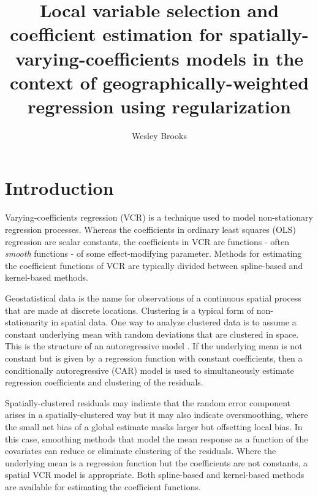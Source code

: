 \documentclass[authoryear, review, 11pt]{elsarticle}
\title{Local variable selection and coefficient estimation for spatially-varying-coefficients models in the context of geographically-weighted regression using regularization}
\author{Wesley Brooks}
\date{}                                           %
\begin{document}
\maketitle





\section{Introduction}
	Varying-coefficients regression (VCR) \citep{Hastie:1993a} is a technique used to model non-stationary regression processes. Whereas the coefficients in ordinary least squares (OLS) regression are scalar constants, the coefficients in VCR are functions - often \emph{smooth} functions - of some effect-modifying parameter.  Methods for estimating the coefficient functions of VCR are typically divided between spline-based \citep{Wood:2006} and kernel-based \citep{Hastie:1993b, Loader:1999} methods. 
	
	Geostatistical data is the name for observations of a continuous spatial process that are made at discrete locations. 
	Clustering is a typical form of non-stationarity in spatial data. One way to analyze clustered data is to assume a constant underlying mean with random deviations that are clustered in space. This is the structure of an autoregressive model \citep{}. If the underlying mean is not constant but is given by a regression function with constant coefficients, then a conditionally autoregressive (CAR) model \citep{} is used to simultaneously estimate regression coefficients and clustering of the residuals.

	Spatially-clustered residuals may indicate that the random error component arises in a spatially-clustered way but it may also indicate oversmoothing, where the small net bias of a global estimate masks larger but offsetting local bias. In this case, smoothing methods that model the mean response as a function of the covariates can reduce or eliminate clustering of the residuals. Where the underlying mean is a regression function but the coefficients are not constants, a spatial VCR model is appropriate. Both spline-based \citep{} and kernel-based \citep{Fotheringham:2002} methods are available for estimating the coefficient functions. 
	
\end{document}
